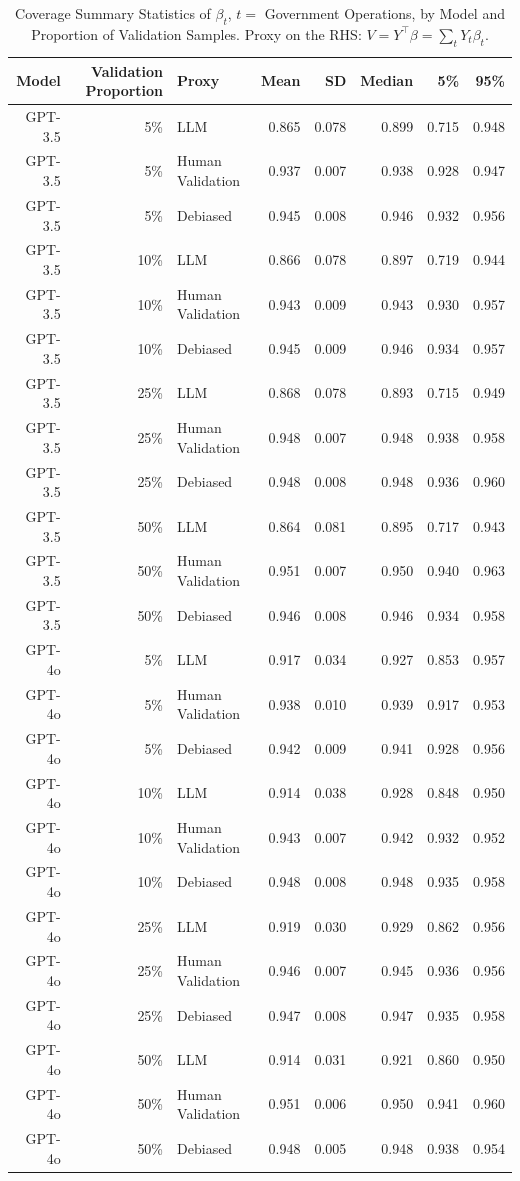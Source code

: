 \begin{table}

\caption{Coverage Summary Statistics of $\beta_{t}$, $t=$ Government Operations, by Model and Proportion of Validation Samples.
      Proxy on the RHS: $V = Y^\top \beta = \sum_{t} Y_t \beta_t$.}
\centering
\begin{tabular}[t]{rrlrrrrr}
\toprule
Model & Validation Proportion & Proxy & Mean & SD & Median & 5\% & 95\%\\
\midrule
GPT-3.5 & 5\% & LLM & 0.865 & 0.078 & 0.899 & 0.715 & 0.948\\
GPT-3.5 & 5\% & Human Validation & 0.937 & 0.007 & 0.938 & 0.928 & 0.947\\
GPT-3.5 & 5\% & Debiased & 0.945 & 0.008 & 0.946 & 0.932 & 0.956\\
GPT-3.5 & 10\% & LLM & 0.866 & 0.078 & 0.897 & 0.719 & 0.944\\
GPT-3.5 & 10\% & Human Validation & 0.943 & 0.009 & 0.943 & 0.930 & 0.957\\
GPT-3.5 & 10\% & Debiased & 0.945 & 0.009 & 0.946 & 0.934 & 0.957\\
GPT-3.5 & 25\% & LLM & 0.868 & 0.078 & 0.893 & 0.715 & 0.949\\
GPT-3.5 & 25\% & Human Validation & 0.948 & 0.007 & 0.948 & 0.938 & 0.958\\
GPT-3.5 & 25\% & Debiased & 0.948 & 0.008 & 0.948 & 0.936 & 0.960\\
GPT-3.5 & 50\% & LLM & 0.864 & 0.081 & 0.895 & 0.717 & 0.943\\
GPT-3.5 & 50\% & Human Validation & 0.951 & 0.007 & 0.950 & 0.940 & 0.963\\
GPT-3.5 & 50\% & Debiased & 0.946 & 0.008 & 0.946 & 0.934 & 0.958\\
GPT-4o & 5\% & LLM & 0.917 & 0.034 & 0.927 & 0.853 & 0.957\\
GPT-4o & 5\% & Human Validation & 0.938 & 0.010 & 0.939 & 0.917 & 0.953\\
GPT-4o & 5\% & Debiased & 0.942 & 0.009 & 0.941 & 0.928 & 0.956\\
GPT-4o & 10\% & LLM & 0.914 & 0.038 & 0.928 & 0.848 & 0.950\\
GPT-4o & 10\% & Human Validation & 0.943 & 0.007 & 0.942 & 0.932 & 0.952\\
GPT-4o & 10\% & Debiased & 0.948 & 0.008 & 0.948 & 0.935 & 0.958\\
GPT-4o & 25\% & LLM & 0.919 & 0.030 & 0.929 & 0.862 & 0.956\\
GPT-4o & 25\% & Human Validation & 0.946 & 0.007 & 0.945 & 0.936 & 0.956\\
GPT-4o & 25\% & Debiased & 0.947 & 0.008 & 0.947 & 0.935 & 0.958\\
GPT-4o & 50\% & LLM & 0.914 & 0.031 & 0.921 & 0.860 & 0.950\\
GPT-4o & 50\% & Human Validation & 0.951 & 0.006 & 0.950 & 0.941 & 0.960\\
GPT-4o & 50\% & Debiased & 0.948 & 0.005 & 0.948 & 0.938 & 0.954\\
\bottomrule
\end{tabular}
\end{table}
